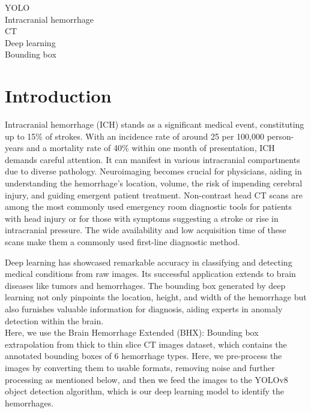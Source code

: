 \documentclass[Print]{../Style/isecure-v24}
\begin{document}
\begin{frontmatter}
\begin{abstract}
\end{abstract}

\begin{keyword}
YOLO \\
Intracranial hemorrhage\\
CT\\
Deep learning\\
Bounding box

\end{keyword}


\makeatother

\end{frontmatter}

\addtolength{\parskip}{2mm}


\section{Introduction} \label{sec:intro}

Intracranial hemorrhage (ICH) stands as a significant medical event, constituting up to 15\% of strokes. With an incidence rate of around 25 per 100,000 person-years and a mortality rate of 40\% within one month of presentation, ICH demands careful attention. It can manifest in various intracranial compartments due to diverse pathology. Neuroimaging becomes crucial for physicians, aiding in understanding the hemorrhage's location, volume, the risk of impending cerebral injury, and guiding emergent patient treatment. Non-contrast head CT scans are among the most commonly used emergency room diagnostic tools for patients with head injury or for those with symptoms suggesting a stroke or rise in intracranial pressure. The wide availability and low acquisition time of these scans make them a commonly used first-line diagnostic method. 

Deep learning has showcased remarkable accuracy in classifying and detecting medical conditions from raw images. Its successful application extends to brain diseases like tumors and hemorrhages. The bounding box generated by deep learning not only pinpoints the location, height, and width of the hemorrhage but also furnishes valuable information for diagnosis, aiding experts in anomaly detection within the brain. \\
Here, we use the Brain Hemorrhage Extended (BHX): Bounding box extrapolation from thick to thin slice CT images dataset, which contains the annotated bounding boxes of 6 hemorrhage types. Here, we pre-process the images by converting them to usable formats, removing noise and further processing as mentioned below, and then we feed the images to the YOLOv8 object detection algorithm, which is our deep learning model to identify the hemorrhages. 
\end{document}
